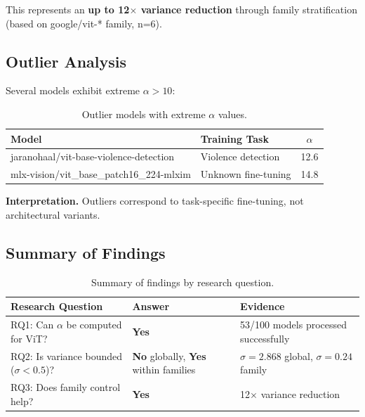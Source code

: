 This represents an \textbf{up to 12$\times$ variance reduction} through family stratification (based on google/vit-* family, n=6).

\subsection{Outlier Analysis}

Several models exhibit extreme $\alpha > 10$:

\begin{table}[h]
\centering
\begin{tabular}{llc}
\toprule
\textbf{Model} & \textbf{Training Task} & $\alpha$ \\
\midrule
jaranohaal/vit-base-violence-detection & Violence detection & 12.6 \\
mlx-vision/vit\_base\_patch16\_224-mlxim & Unknown fine-tuning & 14.8 \\
\bottomrule
\end{tabular}
\caption{Outlier models with extreme $\alpha$ values.}
\label{tab:outliers}
\end{table}

\textbf{Interpretation.} Outliers correspond to task-specific fine-tuning, not architectural variants.

\subsection{Summary of Findings}

\begin{table}[h]
\centering
\begin{tabular}{p{4cm}p{2.5cm}p{5cm}}
\toprule
\textbf{Research Question} & \textbf{Answer} & \textbf{Evidence} \\
\midrule
RQ1: Can $\alpha$ be computed for ViT? & \textbf{Yes} & 53/100 models processed successfully \\
RQ2: Is variance bounded ($\sigma < 0.5$)? & \textbf{No} globally, \textbf{Yes} within families & $\sigma = 2.868$ global, $\sigma = 0.24$ family \\
RQ3: Does family control help? & \textbf{Yes} & 12$\times$ variance reduction \\
\bottomrule
\end{tabular}
\caption{Summary of findings by research question.}
\label{tab:summary}
\end{table}
